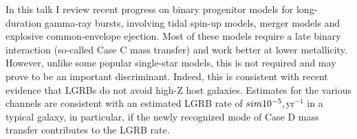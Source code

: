 


\bigskip



\bigskip

\noindent In this talk I review recent progress on binary progenitor models for
long-duration gamma-ray bursts, involving tidal spin-up models, merger
models and explosive common-envelope ejection. Most of these models
require a late binary interaction (so-called Case C mass transfer) and
work better at lower metallicity. However, unlike some popular
single-star models, this is not required and may prove to be an
important discriminant. Indeed, this is
consistent with recent evidence that LGRBs do not avoid high-Z host galaxies.  Estimates for the various channels are consistent with an estimated LGRB rate of $\\sim 10^{-5}\\,$yr$^{-1}$ in
a typical galaxy, in particular, if the newly recognized mode of Case
D mass transfer contributes to the LGRB rate.


